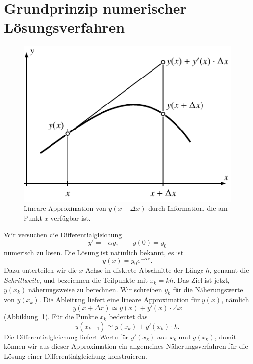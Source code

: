 %
%
%
\section{Grundprinzip numerischer Lösungsverfahren}
\begin{figure}
\centering
\includegraphics{chapters/50-ode/figures/prinzip.pdf}
\caption{Lineare Approximation von $y(x+\Delta x)$ durch Information,
die am Punkt $x$ verfügbar ist.
\label{buch:ode:lineareapproximation}}
\end{figure}
Wir versuchen die Differentialgleichung
\begin{equation}
y'=-\alpha y,\qquad y(0)=y_0
\label{buch:ode:expdgl}
\end{equation}
numerisch zu lösen. 
Die Lösung ist natürlich bekannt, es ist 
\begin{equation}
y(x)=y_0e^{-\alpha x}.
\label{buch:ode:beispiel-loesung}
\end{equation}
Dazu unterteilen wir die $x$-Achse in diskrete Abschnitte der Länge $h$,
genannt die {\em Schrittweite},
%
und bezeichnen die Teilpunkte mit $x_k=kh$.
Das Ziel ist jetzt, $y(x_k)$ näherungsweise zu berechnen.
Wir schreiben $y_k$ für die Näherungswerte von $y(x_k)$.
Die Ableitung liefert eine lineare Approximation für $y(x)$,
nämlich
\[
y(x+\Delta x)\simeq y(x) + y'(x)\cdot\Delta x
\]
(Abbildung~\ref{buch:ode:lineareapproximation}).
Für die Punkte $x_k$ bedeutet das
\[
y(x_{k+1})\simeq y(x_{k})+y'(x_k)\cdot h.
\]
Die Differentialgleichung liefert Werte für $y'(x_k)$ aus $x_k$ und $y(x_k)$,
damit können wir aus dieser Approximation ein allgemeines
Näherungsverfahren für die Lösung einer Differentialgleichung
konstruieren.

